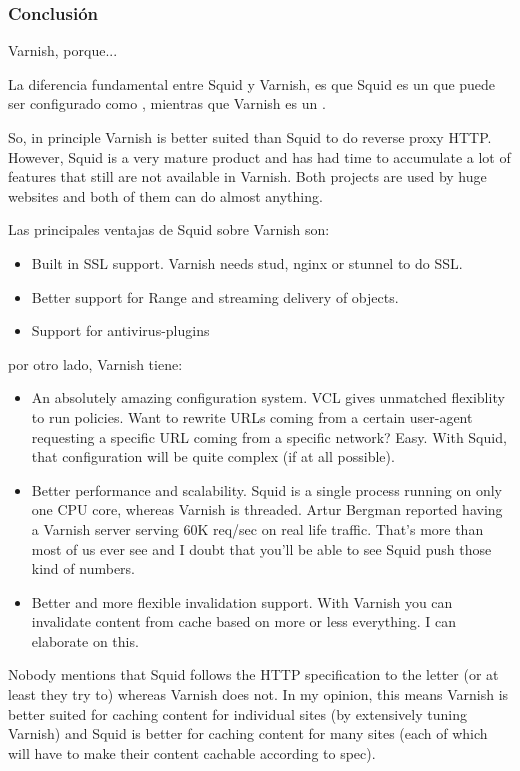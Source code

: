 \subsubsection{Conclusión}

Varnish, porque...

La diferencia fundamental entre Squid y Varnish, es que Squid es un  que puede ser configurado como , mientras que Varnish es un .

So, in principle Varnish is better suited than Squid to do reverse proxy HTTP. However, Squid is a very mature product and has had time to accumulate a lot of features that still are not available in Varnish. Both projects are used by huge websites and both of them can do almost anything.

Las principales ventajas de Squid sobre Varnish son:

\begin{itemize}
  \item Built in SSL support. Varnish needs stud, nginx or stunnel to do SSL.
  \item Better support for Range and streaming delivery of objects.
  \item Support for antivirus-plugins
\end{itemize}

por otro lado, Varnish tiene:

\begin{itemize}
  \item An absolutely amazing configuration system. VCL gives unmatched flexiblity to run policies. Want to rewrite URLs coming from a certain user-agent requesting a specific URL coming from a specific network? Easy. With Squid, that configuration will be quite complex (if at all possible).
  \item Better performance and scalability. Squid is a single process running on only one CPU core, whereas Varnish is threaded. Artur Bergman reported having a Varnish server serving 60K req/sec on real life traffic. That's more than most of us ever see and I doubt that you'll be able to see Squid push those kind of numbers.
  \item Better and more flexible invalidation support. With Varnish you can invalidate content from cache based on more or less everything. I can elaborate on this.
\end{itemize}

Nobody mentions that Squid follows the HTTP specification to the letter (or at least they try to) whereas Varnish does not. In my opinion, this means Varnish is better suited for caching content for individual sites (by extensively tuning Varnish) and Squid is better for caching content for many sites (each of which will have to make their content cachable according to spec).
